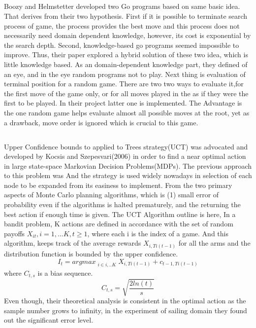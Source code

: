 \documentclass[11pt]{article}
\begin{document}
\subsection{}
Boozy and Helmstetter developed two Go programs based on same basic idea\cite{bouzy2004monte}. That derives from their two hypothesis. First if it is possible to terminate search process of game, the process provides the best move and this process does not necessarily need domain dependent knowledge, however, its cost is exponential by the search depth. Second, knowledge-based go programs seemed impossible to improve. Thus, their paper explored a hybrid solution of these two idea, which is little knowledge based. As an domain-dependent knowledge part, they defined of an {eye}, and in the {eye} random programs not to play. Next thing is evaluation of terminal position for a random game. There are two two ways to evaluate it,{for the first move of the game only}, or  {for all moves played in the as if they were the first to be played.} In their project latter one is implemented. The Advantage is the one random game helps evaluate almost all possible moves at the root, yet as a drawback, move order is ignored which is crucial to this game. 

\subsection{}
Upper Confidence bounds to applied to Trees strategy(UCT) was advocated and developed by Kocsis and Szepesvari(2006) in order to find a near optimal action in large state-space Markovian Decision Problems(MDPs)\cite{kocsis2006bandit}. The previous approach to this problem was 
And the strategy is used widely nowadays in selection of each node to be expanded from its easiness to implement.
From the two primary aspects of Monte Carlo planning algorithms, which is (1) small error of probability even if the algorithms is halted prematurely, and the returning the best action if enough time is given. The UCT Algorithm outline is here, In a bandit problem, K actions are defined in accordance with the set of random payoffs \(X_{it}, i = 1, ... K, t\geq 1\), where each i is the index of a game. And this algorithm, keeps track of the average rewards \(X_{i, Ti(t-1)}\) for all the arms and the distribution function is bounded by the upper confidence. 
\[ I_{t} = argmax_{\substack{i \in{i, .. K}}} {X_{i, Ti(t-1)} + c_{t-1, Ti(t-1)}}\]
where \(C_{t, s}\) is a bias sequence.
\[C_{t, s} = \sqrt{\frac{2ln(t)}{s}}\]
Even though, their theoretical analysis is consistent in the optimal action as the sample number grows to infinity, in the experiment of sailing domain they found out the significant error level. 
\end{document}
